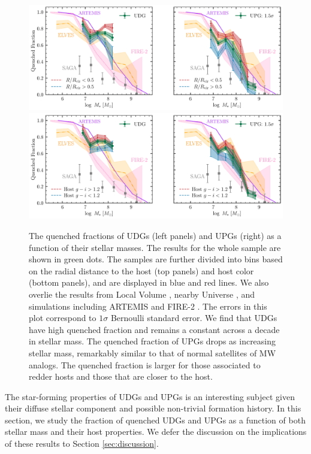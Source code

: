 \documentclass[twocolumn,astrosymb,twocolappendix]{aastex631}
\begin{document}
\begin{CJK*}{UTF8}{gbsn}
\begin{figure}
	\vbox{ 
		\centering
		\includegraphics[width=1\linewidth]{quenched_frac_dist2host.pdf}
		\includegraphics[width=1\linewidth]{quenched_frac_host_color.pdf}
	}
    \caption{The quenched fractions of UDGs (left panels) and UPGs (right) as a function of their stellar masses. The results for the whole sample are shown in green dots. The samples are further divided into bins based on the radial distance to the host (top panels) and host color (bottom panels), and are displayed in blue and red lines. We also overlie the results from Local Volume \citep[ELVES,][]{CarlstenELVES2022}, nearby Universe \citep[SAGA,][]{SAGA-II}, and simulations including ARTEMIS \citep{Font2022} and FIRE-2 \citep{Samuel2022}. The errors in this plot correspond to $1\sigma$ Bernoulli standard error. We find that UDGs have high quenched fraction and remains a constant across a decade in stellar mass. The quenched fraction of UPGs drops as increasing stellar mass, remarkably similar to that of normal satellites of MW analogs. The quenched fraction is larger for those associated to redder hosts and those that are closer to the host. }
    \label{fig:qfrac}
\end{figure}

The star-forming properties of UDGs and UPGs is an interesting subject given their diffuse stellar component and possible non-trivial formation history. In this section, we study the fraction of quenched UDGs and UPGs as a function of both stellar mass and their host properties. We defer the discussion on the implications of these results to Section \ref{sec:discussion}.


\end{CJK*}
\end{document}
